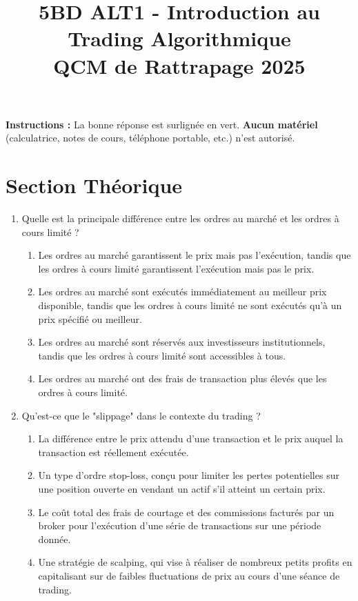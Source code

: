 \documentclass[a4paper,12pt]{article}
\title{5BD ALT1 - Introduction au Trading Algorithmique \\ \textbf{QCM de Rattrapage 2025}}
\author{}
\date{}
\begin{document}
\maketitle

\vspace{1cm}

\textbf{Instructions :} La bonne réponse est surlignée en vert.
\textbf{Aucun matériel} (calculatrice, notes de cours, téléphone portable, etc.) n'est autorisé.

\vspace{0.5cm}

\section*{Section Théorique}

\begin{enumerate}
    \item Quelle est la principale différence entre les ordres au marché et les ordres à cours limité ?
    \begin{enumerate}[label=(\Alph*)]
        \item Les ordres au marché garantissent le prix mais pas l'exécution, tandis que les ordres à cours limité garantissent l'exécution mais pas le prix.
        \item Les ordres au marché sont exécutés immédiatement au meilleur prix disponible, tandis que les ordres à cours limité ne sont exécutés qu'à un prix spécifié ou meilleur.
        \item Les ordres au marché sont réservés aux investisseurs institutionnels, tandis que les ordres à cours limité sont accessibles à tous.
        \item Les ordres au marché ont des frais de transaction plus élevés que les ordres à cours limité.
    \end{enumerate}

    \item Qu'est-ce que le "slippage" dans le contexte du trading ?
    \begin{enumerate}[label=(\Alph*)]
        \item La différence entre le prix attendu d'une transaction et le prix auquel la transaction est réellement exécutée.
        \item Un type d'ordre stop-loss, conçu pour limiter les pertes potentielles sur une position ouverte en vendant un actif s'il atteint un certain prix.
        \item Le coût total des frais de courtage et des commissions facturés par un broker pour l'exécution d'une série de transactions sur une période donnée.
        \item Une stratégie de scalping, qui vise à réaliser de nombreux petits profits en capitalisant sur de faibles fluctuations de prix au cours d'une séance de trading.
    \end{enumerate}
    

\end{enumerate}
\end{document}

